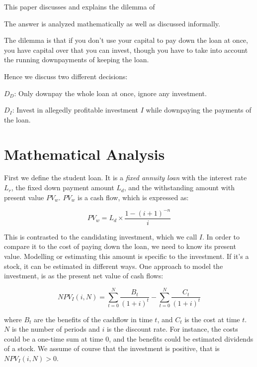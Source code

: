 \documentclass[a4paper]{article}
\title{\documenttitle}
\date{\today}
\author{Frans Englich \\
\href{mailto:fenglich@fastmail.fm}{fenglich@fastmail.fm}}
\begin{document}
\maketitle

This paper discusses and explains the dilemma of 

The answer is analyzed mathematically as well as discussed
informally.

The dilemma is that if you don't use your capital to pay down the loan at once,
you have capital over that you can invest, though you have to take into account
the running downpayments of keeping the loan.

Hence we discuss two different decisions:

$D_D$: Only downpay the whole loan at once, ignore any investment.

$D_I$: Invest in allegedly profitable investment $I$ while downpaying the
payments of the loan.

\section{Mathematical Analysis}

First we define the student loan. It is a \emph{fixed annuity loan} with the
interest rate $L_r$, the fixed down payment amount $L_d$, and the withstanding
amount with present value $PV_w$. $PV_w$ is a cash flow, which is expressed as:

\def\PV_w{L_d \times \frac{1 - (i + 1)^{-n}}{i}}
\begin{equation}
PV_w=\PV_w
\end{equation}

This is contrasted to the candidating investment, which we call $I$. In order to
compare it to the cost of paying down the loan, we need to know its present
value. Modelling or estimating this amount is specific to the investment. If
it's a stock, it can be estimated in different ways. One approach to model the
investment, is as the present net value of cash flows:

\def\NPV_I{\sum_{t=0}^{N} \frac{B_t}{(1 + i)^t} - \sum_{t=0}^{N} \frac{C_t}{(1 + i)^t}}
\begin{equation}
NPV_I(i, N)= \NPV_I
\end{equation}

where $B_t$ are the benefits of the cashflow in time $t$, and $C_t$ is the cost
at time $t$. $N$ is the number of periods and $i$ is the discount rate. For
instance, the costs could be a one-time sum at time $0$, and the benefits could
be estimated dividends of a stock. We assume of course that the investment is
positive, that is $NPV_I(i, N) > 0$.
\end{document}
